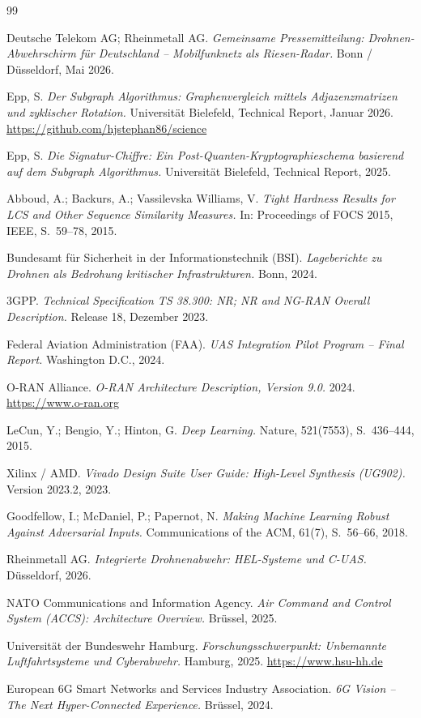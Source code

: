 ﻿\documentclass[a4paper,12pt]{article}
\theoremstyle{definition}
\begin{document}
\begin{thebibliography}{99}

Deutsche Telekom AG; Rheinmetall AG.
\textit{Gemeinsame Pressemitteilung: Drohnen-Abwehrschirm f\"ur Deutschland --
Mobilfunknetz als Riesen-Radar.}
Bonn / D\"usseldorf, Mai 2026.

Epp, S.
\textit{Der Subgraph Algorithmus: Graphenvergleich mittels Adjazenzmatrizen
und zyklischer Rotation.}
Universit\"at Bielefeld, Technical Report, Januar 2026.
\url{https://github.com/hjstephan86/science}

Epp, S.
\textit{Die Signatur-Chiffre: Ein Post-Quanten-Kryptographieschema
basierend auf dem Subgraph Algorithmus.}
Universit\"at Bielefeld, Technical Report, 2025.

Abboud, A.; Backurs, A.; Vassilevska Williams, V.
\textit{Tight Hardness Results for LCS and Other Sequence Similarity Measures.}
In: Proceedings of FOCS 2015, IEEE, S.~59--78, 2015.

Bundesamt f\"ur Sicherheit in der Informationstechnik (BSI).
\textit{Lageberichte zu Drohnen als Bedrohung kritischer Infrastrukturen.}
Bonn, 2024.

3GPP.
\textit{Technical Specification TS 38.300: NR; NR and NG-RAN Overall Description.}
Release 18, Dezember 2023.

Federal Aviation Administration (FAA).
\textit{UAS Integration Pilot Program -- Final Report.}
Washington D.C., 2024.

O-RAN Alliance.
\textit{O-RAN Architecture Description, Version 9.0.}
2024. \url{https://www.o-ran.org}

LeCun, Y.; Bengio, Y.; Hinton, G.
\textit{Deep Learning.}
Nature, 521(7553), S.~436--444, 2015.

Xilinx / AMD.
\textit{Vivado Design Suite User Guide: High-Level Synthesis (UG902).}
Version 2023.2, 2023.

Goodfellow, I.; McDaniel, P.; Papernot, N.
\textit{Making Machine Learning Robust Against Adversarial Inputs.}
Communications of the ACM, 61(7), S.~56--66, 2018.

Rheinmetall AG.
\textit{Integrierte Drohnenabwehr: HEL-Systeme und C-UAS.}
D\"usseldorf, 2026.

NATO Communications and Information Agency.
\textit{Air Command and Control System (ACCS): Architecture Overview.}
Brüssel, 2025.

Universit\"at der Bundeswehr Hamburg.
\textit{Forschungsschwerpunkt: Unbemannte Luftfahrtsysteme und Cyberabwehr.}
Hamburg, 2025. \url{https://www.hsu-hh.de}

European 6G Smart Networks and Services Industry Association.
\textit{6G Vision -- The Next Hyper-Connected Experience.}
Brüssel, 2024.

\end{thebibliography}
\end{document}
